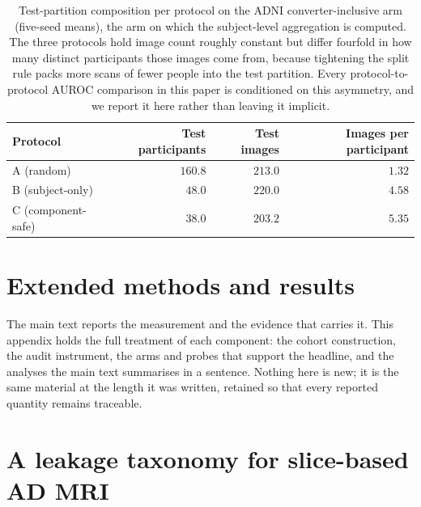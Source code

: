 \documentclass[11pt]{article}
\begin{document}
\begin{table}[!ht]
\centering
\small
\caption{Test-partition composition per protocol on the ADNI
converter-inclusive arm (five-seed means), the arm on which the
subject-level aggregation is computed. The three protocols hold image count roughly constant
but differ fourfold in how many distinct participants those images come
from, because tightening the split rule packs more scans of fewer people
into the test partition. Every protocol-to-protocol AUROC comparison in
this paper is conditioned on this asymmetry, and we report it here rather
than leaving it implicit.}
\label{tab:test_composition}
\begin{tabular}{@{}lrrr@{}}
\toprule
\textbf{Protocol} & \textbf{Test participants} & \textbf{Test images}
                  & \textbf{Images per participant} \\
\midrule
A (random)         & $160.8$ & $213.0$ & $1.32$ \\
B (subject-only)   & $48.0$  & $220.0$ & $4.58$ \\
C (component-safe) & $38.0$  & $203.2$ & $5.35$ \\
\bottomrule
\end{tabular}
\end{table}





\section{Extended methods and results}
\label{sm:extended}
The main text reports the measurement and the evidence that carries it. This
appendix holds the full treatment of each component: the cohort construction,
the audit instrument, the arms and probes that support the headline, and the
analyses the main text summarises in a sentence. Nothing here is new; it is the
same material at the length it was written, retained so that every reported
quantity remains traceable.
\section{A leakage taxonomy for slice-based AD MRI}
\label{sm:sec:taxonomy}
\end{document}
